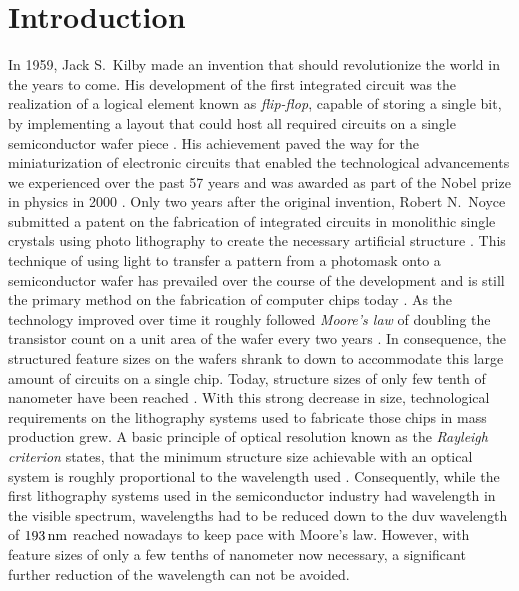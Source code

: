 \chapter{Introduction} \label{ch:Intro}
In 1959, Jack S.~Kilby made an invention that should revolutionize the world in the years to come. His development of the first integrated circuit was the realization of a logical element known as \emph{flip-flop}, capable of storing a single bit, by implementing a layout that could host all required circuits on a single semiconductor wafer piece  \cite{kilby_invention_1976}. His achievement paved the way for the miniaturization of electronic circuits that enabled the technological advancements we experienced over the past 57 years and was awarded as part of the Nobel prize in physics in 2000 \cite{noauthor_press_nodate}. Only two years after the original invention, Robert N.~Noyce submitted a patent on the fabrication of integrated circuits in monolithic single crystals using photo lithography to create the necessary artificial structure \cite{noyce_semiconductor_1961}. This technique of using light to transfer a pattern from a photomask onto a semiconductor wafer has prevailed over the course of the development and is still the primary method on the fabrication of computer chips today \cite{mack_fundamental_2008}. As the technology improved over time it roughly followed \emph{Moore's law} of doubling the transistor count on a unit area of the wafer every two years \cite{moore_cramming_1998}. In consequence, the structured feature sizes on the wafers shrank to down to accommodate this large amount of circuits on a single chip. Today, structure sizes of only few tenth of nanometer have been reached \cite{international_roadmap_committee_international_2015}. With this strong decrease in size, technological requirements on the lithography systems used to fabricate those chips in mass production grew. A basic principle of optical resolution known as the \emph{Rayleigh criterion} states, that the minimum structure size achievable with an optical system is roughly proportional to the wavelength used \cite{lord_rayleigh_xxxi._1879}. Consequently, while the first lithography systems used in the semiconductor industry had wavelength in the visible spectrum, wavelengths had to be reduced down to the \gls{duv} wavelength of $\nm{193}$ reached nowadays to keep pace with Moore's law. However, with feature sizes of only a few tenths of nanometer now necessary, a significant further reduction of the wavelength can not be avoided.  

